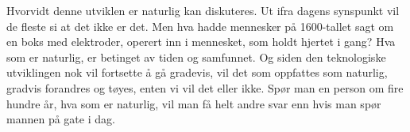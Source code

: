 Hvorvidt denne utviklen er naturlig kan diskuteres. Ut ifra dagens synspunkt vil de fleste si at det ikke er det. Men hva hadde mennesker på 1600-tallet sagt om en boks med elektroder, operert inn i mennesket, som holdt hjertet i gang?
Hva som er naturlig, er betinget av tiden og samfunnet. Og siden den teknologiske utviklingen nok vil fortsette å gå gradevis, vil det som oppfattes som naturlig, gradvis forandres og tøyes, enten vi vil det eller ikke. Spør man en person om fire hundre år, hva som er naturlig, vil man få helt andre svar enn hvis man spør mannen på gate i dag.